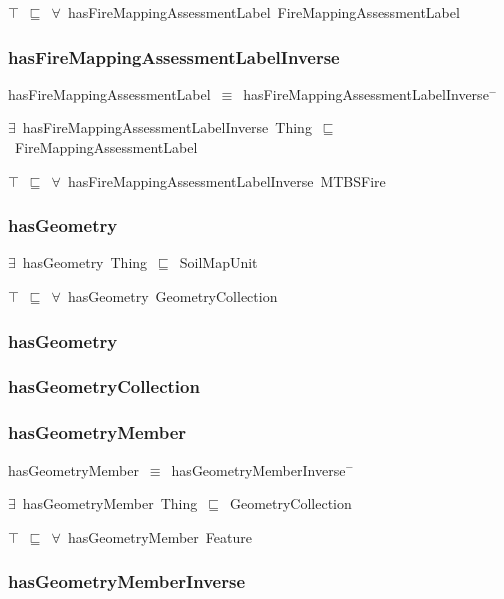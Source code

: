 \documentclass{article}
\begin{document}
\ensuremath{\top}~\ensuremath{\sqsubseteq}~\ensuremath{\forall}~hasFireMappingAssessmentLabel~FireMappingAssessmentLabel

\subsubsection*{hasFireMappingAssessmentLabelInverse}

hasFireMappingAssessmentLabel~\ensuremath{\equiv}~hasFireMappingAssessmentLabelInverse\ensuremath{^-}

\ensuremath{\exists}~hasFireMappingAssessmentLabelInverse~Thing~\ensuremath{\sqsubseteq}~FireMappingAssessmentLabel

\ensuremath{\top}~\ensuremath{\sqsubseteq}~\ensuremath{\forall}~hasFireMappingAssessmentLabelInverse~MTBSFire

\subsubsection*{hasGeometry}

\ensuremath{\exists}~hasGeometry~Thing~\ensuremath{\sqsubseteq}~SoilMapUnit

\ensuremath{\top}~\ensuremath{\sqsubseteq}~\ensuremath{\forall}~hasGeometry~GeometryCollection

\subsubsection*{hasGeometry}

\subsubsection*{hasGeometryCollection}

\subsubsection*{hasGeometryMember}

hasGeometryMember~\ensuremath{\equiv}~hasGeometryMemberInverse\ensuremath{^-}

\ensuremath{\exists}~hasGeometryMember~Thing~\ensuremath{\sqsubseteq}~GeometryCollection

\ensuremath{\top}~\ensuremath{\sqsubseteq}~\ensuremath{\forall}~hasGeometryMember~Feature

\subsubsection*{hasGeometryMemberInverse}
\end{document}

